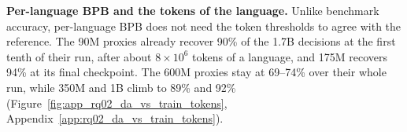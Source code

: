 \textbf{Per-language BPB and the tokens of the language.}
Unlike benchmark accuracy, per-language BPB does not need the token thresholds to agree with the reference. The 90M proxies already recover 90\% of the 1.7B decisions at the first tenth of their run, after about $8\times10^{6}$ tokens of a language, and 175M recovers 94\% at its final checkpoint. The 600M proxies stay at 69--74\% over their whole run, while 350M and 1B climb to 89\% and 92\% (Figure~\ref{fig:app_rq02_da_vs_train_tokens}, Appendix~\ref{app:rq02_da_vs_train_tokens}).




